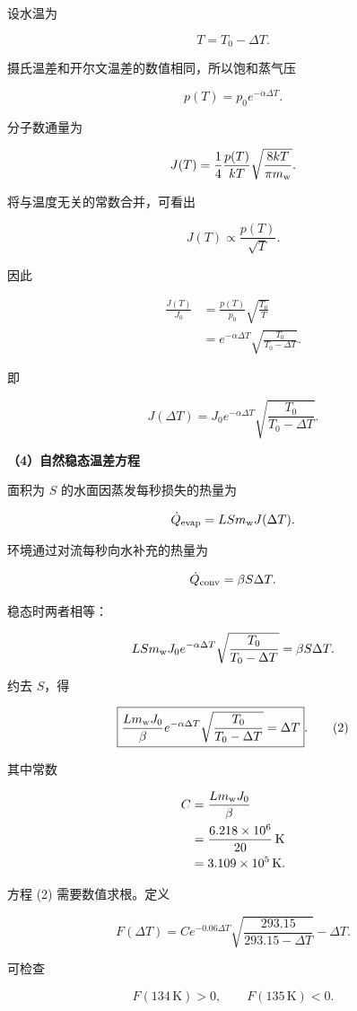 \documentclass[12pt,a4paper,UTF8]{ctexart}
\begin{document}
设水温为

\[
T=T_0-\Delta T.
\]

摄氏温差和开尔文温差的数值相同，所以饱和蒸气压

\[
p(T)=p_0e^{-\alpha\Delta T}.
\]

分子数通量为

\[
J(T)=\frac14\frac{p(T)}{kT}
\sqrt{\frac{8kT}{\pi m_{\rm w}}}.
\]

将与温度无关的常数合并，可看出

\[
J(T)\propto\frac{p(T)}{\sqrt T}.
\]

因此

\[
\begin{aligned}
\frac{J(T)}{J_0}
&=\frac{p(T)}{p_0}
\sqrt{\frac{T_0}{T}}\\
&=e^{-\alpha\Delta T}
\sqrt{\frac{T_0}{T_0-\Delta T}}.
\end{aligned}
\]

即

\[
\boxed{
J(\Delta T)=J_0e^{-\alpha\Delta T}
\sqrt{\frac{T_0}{T_0-\Delta T}}
}. \tag{1}
\]

\textbf{（4）自然稳态温差方程}

面积为 \(S\) 的水面因蒸发每秒损失的热量为

\[
\dot Q_{\rm evap}
=LSm_{\rm w}J(\Delta T).
\]

环境通过对流每秒向水补充的热量为

\[
\dot Q_{\rm conv}=\beta S\Delta T.
\]

稳态时两者相等：

\[
LSm_{\rm w}J_0e^{-\alpha\Delta T}
\sqrt{\frac{T_0}{T_0-\Delta T}}
=\beta S\Delta T.
\]

约去 \(S\)，得

\[
\boxed{
\frac{Lm_{\rm w}J_0}{\beta}
e^{-\alpha\Delta T}
\sqrt{\frac{T_0}{T_0-\Delta T}}
=\Delta T
}. \tag{2}
\]

其中常数

\[
\begin{aligned}
C
&=\frac{Lm_{\rm w}J_0}{\beta}\\
&=\frac{6.218\times10^6}{20}\,\mathrm K\\
&=3.109\times10^5\,\mathrm K.
\end{aligned}
\]

方程 (2) 需要数值求根。定义

\[
F(\Delta T)=
C e^{-0.06\Delta T}
\sqrt{\frac{293.15}{293.15-\Delta T}}
-\Delta T.
\]

可检查

\[
F(134\,\mathrm K)>0,
\qquad
F(135\,\mathrm K)<0.
\]
\end{document}
